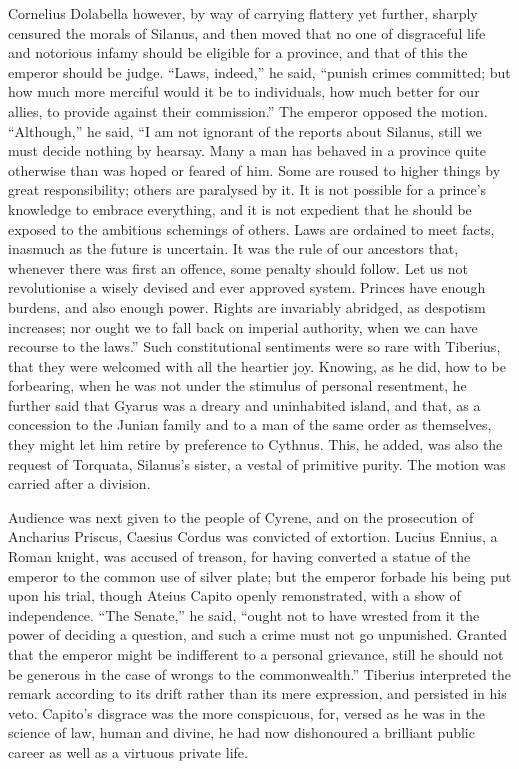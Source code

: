Cornelius Dolabella however, by way of carrying flattery yet further, sharply censured the morals of Silanus, and then moved that no one of disgraceful life and notorious infamy should be eligible for a province, and that of this the emperor should be judge. ``Laws, indeed,'' he said, ``punish crimes committed; but how much more merciful would it be to individuals, how much better for our allies, to provide against their commission.'' The emperor opposed the motion. ``Although,'' he said, ``I am not ignorant of the reports about Silanus, still we must decide nothing by hearsay. Many a man has behaved in a province quite otherwise than was hoped or feared of him. Some are roused to higher things by great responsibility; others are paralysed by it. It is not possible for a prince's knowledge to embrace everything, and it is not expedient that he should be exposed to the ambitious schemings of others. Laws are ordained to meet facts, inasmuch as the future is uncertain. It was the rule of our ancestors that, whenever there was first an offence, some penalty should follow. Let us not revolutionise a wisely devised and ever approved system. Princes have enough burdens, and also enough power. Rights are invariably abridged, as despotism increases; nor ought we to fall back on imperial authority, when we can have recourse to the laws.'' Such constitutional sentiments were so rare with Tiberius, that they were welcomed with all the heartier joy. Knowing, as he did, how to be forbearing, when he was not under the stimulus of personal resentment, he further said that Gyarus was a dreary and uninhabited island, and that, as a concession to the Junian family and to a man of the same order as themselves, they might let him retire by preference to Cythnus. This, he added, was also the request of Torquata, Silanus's sister, a vestal of primitive purity. The motion was carried after a division.


Audience was next given to the people of Cyrene, and on the prosecution of Ancharius Priscus, Caesius Cordus was convicted of extortion. Lucius Ennius, a Roman knight, was accused of treason, for having converted a statue of the emperor to the common use of silver plate; but the emperor forbade his being put upon his trial, though Ateius Capito openly remonstrated, with a show of independence. ``The Senate,'' he said, ``ought not to have wrested from it the power of deciding a question, and such a crime must not go unpunished. Granted that the emperor might be indifferent to a personal grievance, still he should not be generous in the case of wrongs to the commonwealth.'' Tiberius interpreted the remark according to its drift rather than its mere expression, and persisted in his veto. Capito's disgrace was the more conspicuous, for, versed as he was in the science of law, human and divine, he had now dishonoured a brilliant public career as well as a virtuous private life.

